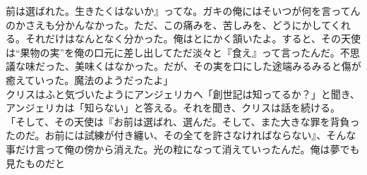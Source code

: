 \documentclass[b5j,10pt,openany]{jsbook}
\begin{document}
前は選ばれた。生きたくはないか』ってな。ガキの俺にはそいつが何を言ってんのかさえも分かんなかった。ただ、この痛みを、苦しみを、どうにかしてくれる。それだけはなんとなく分かった。俺はとにかく頷いたよ。すると、その天使は``果物の実''を俺の口元に差し出してただ淡々と『食え』って言ったんだ。不思議な味だった、美味くはなかった。だが、その実を口にした途端みるみると傷が癒えていった。魔法のようだったよ」\\クリスはふと気づいたようにアンジェリカへ「創世記は知ってるか？」と聞き、アンジェリカは「知らない」と答える。それを聞き、クリスは話を続ける。\\「そして、その天使は『お前は選ばれ、選んだ。そして、また大きな罪を背負ったのだ。お前には試練が付き纏い、その全てを許さなければならない』、そんな事だけ言って俺の傍から消えた。光の粒になって消えていったんだ。俺は夢でも見たものだと
\end{document}
